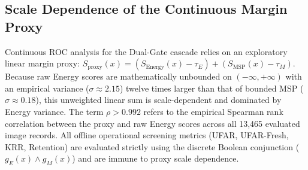 \enlargethispage{3\baselineskip}
\vspace*{-10pt}\subsection{Scale Dependence of the Continuous Margin Proxy}
\vspace*{-3pt}
\label{sec:limitations_proxy_scale}

Continuous ROC analysis for the Dual-Gate cascade relies on an exploratory linear margin proxy: $S_{\text{proxy}}(x) = (S_{\text{Energy}}(x) - \tau_E) + (S_{\text{MSP}}(x) - \tau_M)$. Because raw Energy scores are mathematically unbounded on $(-\infty, +\infty)$ with an empirical variance ($\sigma \approx 2.15$) twelve times larger than that of bounded MSP ($\sigma \approx 0.18$), this unweighted linear sum is scale-dependent and dominated by Energy variance. The term $\rho > 0.992$ refers to the empirical Spearman rank correlation between the proxy and raw Energy scores across all 13,465 evaluated image records. All offline operational screening metrics (UFAR, UFAR-Fresh, KRR, Retention) are evaluated strictly using the discrete Boolean conjunction ($g_E(x) \land g_M(x)$) and are immune to proxy scale dependence.
